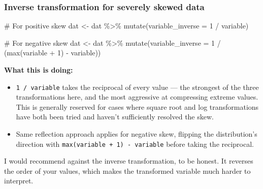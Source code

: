 \documentclass[
  letterpaper,
  DIV=11,
  numbers=noendperiod]{scrreprt}
\newenvironment{Shaded}{\begin{snugshade}}{\end{snugshade}}
\newcommand{\AttributeTok}[1]{\textcolor[rgb]{0.40,0.45,0.13}{#1}}
\newcommand{\CommentTok}[1]{\textcolor[rgb]{0.37,0.37,0.37}{#1}}
\newcommand{\DecValTok}[1]{\textcolor[rgb]{0.68,0.00,0.00}{#1}}
\newcommand{\FunctionTok}[1]{\textcolor[rgb]{0.28,0.35,0.67}{#1}}
\newcommand{\NormalTok}[1]{\textcolor[rgb]{0.00,0.23,0.31}{#1}}
\newcommand{\OtherTok}[1]{\textcolor[rgb]{0.00,0.23,0.31}{#1}}
\newcommand{\SpecialCharTok}[1]{\textcolor[rgb]{0.37,0.37,0.37}{#1}}
\begin{document}
\subsubsection{Inverse transformation for severely skewed
data}\label{inverse-transformation-for-severely-skewed-data}

\begin{Shaded}
\begin{Highlighting}[]
\CommentTok{\# For positive skew}
\NormalTok{dat }\OtherTok{\textless{}{-}}\NormalTok{ dat }\SpecialCharTok{\%\textgreater{}\%}
  \FunctionTok{mutate}\NormalTok{(}\AttributeTok{variable\_inverse =} \DecValTok{1} \SpecialCharTok{/}\NormalTok{ variable)}

\CommentTok{\# For negative skew}
\NormalTok{dat }\OtherTok{\textless{}{-}}\NormalTok{ dat }\SpecialCharTok{\%\textgreater{}\%}
  \FunctionTok{mutate}\NormalTok{(}\AttributeTok{variable\_inverse =} \DecValTok{1} \SpecialCharTok{/}\NormalTok{ (}\FunctionTok{max}\NormalTok{(variable }\SpecialCharTok{+} \DecValTok{1}\NormalTok{) }\SpecialCharTok{{-}}\NormalTok{ variable))}
\end{Highlighting}
\end{Shaded}

\textbf{What this is doing:}

\begin{itemize}
\item
  \texttt{1\ /\ variable} takes the reciprocal of every value --- the
  strongest of the three transformations here, and the most aggressive
  at compressing extreme values. This is generally reserved for cases
  where square root and log transformations have both been tried and
  haven't sufficiently resolved the skew.
\item
  Same reflection approach applies for negative skew, flipping the
  distribution's direction with
  \texttt{max(variable\ +\ 1)\ -\ variable} before taking the
  reciprocal.
\end{itemize}

\begin{tcolorbox}[enhanced jigsaw, toprule=.15mm, coltitle=black, colframe=quarto-callout-warning-color-frame, colbacktitle=quarto-callout-warning-color!10!white, opacityback=0, left=2mm, breakable, rightrule=.15mm, bottomrule=.15mm, leftrule=.75mm, titlerule=0mm, arc=.35mm, opacitybacktitle=0.6, toptitle=1mm, bottomtitle=1mm, title=\textcolor{quarto-callout-warning-color}{\faExclamationTriangle}\hspace{0.5em}{Warning}, colback=white]

I would recommend against the inverse transformation, to be honest. It
reverses the order of your values, which makes the transformed variable
much harder to interpret.

\end{tcolorbox}
\end{document}
